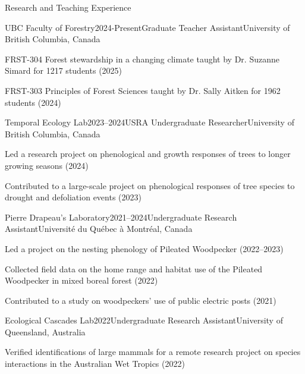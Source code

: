 \documentclass[
	11pt, %
]{resume} %
\begin{document}
\begin{rSection}{Research and Teaching Experience}
	\begin{rSubsection}{UBC Faculty of Forestry}{2024-Present}{Graduate Teacher Assistant}{University of British Columbia, Canada}
		\item  FRST-304 Forest stewardship in a changing climate taught by Dr. Suzanne Simard for 1217 students (2025)
		\item  FRST-303 Principles of Forest Sciences taught by Dr. Sally Aitken for 1962 students (2024) 
	\end{rSubsection}
	\begin{rSubsection}{Temporal Ecology Lab}{2023–2024}{USRA Undergraduate Researcher}{University of British Columbia, Canada}
		\item Led a research project on phenological and growth responses of trees to longer growing seasons (2024)
		\item Contributed to a large-scale project on phenological responses of tree species to drought and defoliation events (2023)
	\end{rSubsection}
	\begin{rSubsection}{Pierre Drapeau’s Laboratory}{2021–2024}{Undergraduate Research Assistant}{Université du Québec à Montréal, Canada}
		\item Led a project on the nesting phenology of Pileated Woodpecker (2022–2023)
		\item	 Collected field data on the home range and habitat use of the Pileated Woodpecker in mixed boreal forest (2022)
		\item Contributed to a study on woodpeckers' use of public electric posts (2021)
	\end{rSubsection}
	\begin{rSubsection}{Ecological Cascades Lab}{2022}{Undergraduate Research Assistant}{University of Queensland, Australia}
		\item Verified identifications of large mammals for a remote research project on species interactions in the Australian Wet Tropics (2022)
	\end{rSubsection}
\end{rSection}
\end{document}
